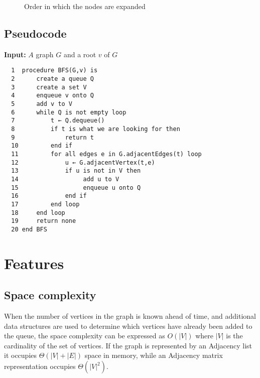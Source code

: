 \documentclass{article}
\begin{document}
  \begin{figure}
    \centering
    \caption{Order in which the nodes are expanded}\label{F:bgs}
  \end{figure}
  

  \subsection{Pseudocode}
  \textbf{Input:} $A$ graph $G$ and a root $v$ of $G$

  \begin{verbatim}
  1  procedure BFS(G,v) is
  2      create a queue Q
  3      create a set V
  4      enqueue v onto Q
  5      add v to V
  6      while Q is not empty loop
  7          t ← Q.dequeue()
  8          if t is what we are looking for then
  9              return t
  10         end if
  11         for all edges e in G.adjacentEdges(t) loop
  12             u ← G.adjacentVertex(t,e)
  13             if u is not in V then
  14                  add u to V
  15                  enqueue u onto Q
  16             end if
  17         end loop
  18     end loop
  19     return none
  20 end BFS
  \end{verbatim}

  \section{Features}

  \subsection{Space complexity}

  When the number of vertices in the graph is known ahead of time, and additional data structures are used to determine which vertices have already been added to the queue, the space complexity can be expressed as $O(|V|)$ where $|V|$ is the cardinality of the set of vertices. If the graph is represented by an Adjacency list it occupies $\Theta(|V|+|E|)$ space in memory, while an Adjacency matrix representation occupies $\Theta(|V|^2)$.
\end{document}
